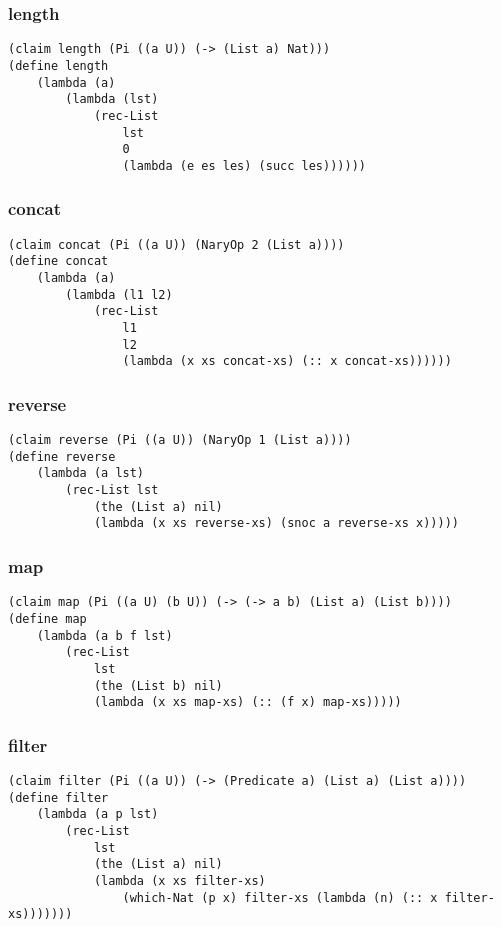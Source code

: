 \subsubsection{length} \label{code:length}
\begin{verbatim}
(claim length (Pi ((a U)) (-> (List a) Nat)))
(define length
    (lambda (a)
        (lambda (lst)
            (rec-List
                lst
                0
                (lambda (e es les) (succ les))))))
\end{verbatim}

\subsubsection{concat} \label{code:concat}
\begin{verbatim}
(claim concat (Pi ((a U)) (NaryOp 2 (List a))))
(define concat
    (lambda (a)
        (lambda (l1 l2)
            (rec-List
                l1
                l2
                (lambda (x xs concat-xs) (:: x concat-xs))))))
\end{verbatim}

\subsubsection{reverse} \label{code:reverse}
\begin{verbatim}
(claim reverse (Pi ((a U)) (NaryOp 1 (List a))))
(define reverse
    (lambda (a lst)
        (rec-List lst
            (the (List a) nil)
            (lambda (x xs reverse-xs) (snoc a reverse-xs x)))))
\end{verbatim}

\subsubsection{map} \label{code:map}
\begin{verbatim}
(claim map (Pi ((a U) (b U)) (-> (-> a b) (List a) (List b))))
(define map
    (lambda (a b f lst)
        (rec-List
            lst
            (the (List b) nil)
            (lambda (x xs map-xs) (:: (f x) map-xs)))))
\end{verbatim}

\subsubsection{filter} \label{code:filter}
\begin{verbatim}
(claim filter (Pi ((a U)) (-> (Predicate a) (List a) (List a))))
(define filter
    (lambda (a p lst)
        (rec-List
            lst
            (the (List a) nil)
            (lambda (x xs filter-xs)
                (which-Nat (p x) filter-xs (lambda (n) (:: x filter-xs)))))))
\end{verbatim}

